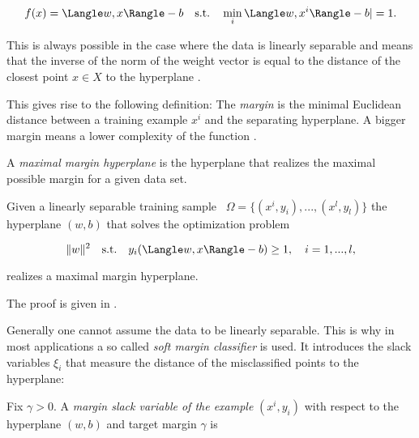 \[ f(x) = \Langle w, x\Rangle - b  \quad \text{s.t.} \quad \min_i \Langle w,x^i\Rangle -b| = 1.\] 

This is always possible in the case where the data is  linearly separable and means that the inverse of the norm of the weight vector is equal to the distance of the closest point \(x \in X \) to  the hyperplane \cite[p. 10]{Kunapuli2008}.



This gives rise to the following definition:
The \emph{margin} is the minimal Euclidean distance between a training example \(x^i\) and the separating hyperplane.
A bigger margin means a lower complexity of the function \cite{Cristianini2000}. 

A \emph{maximal margin hyperplane} is the hyperplane that realizes the maximal possible margin for a given data set.

\begin{proposition}
Given a linearly separable training sample \ \(\Omega = \{(x^i,y_i),...,(x^l,y_l)\}\) the hyperplane \((w,b)\) that solves the optimization problem

\[\|w\|^2 \quad \text{s.t.} \quad y_i(\Langle w,x\Rangle-b)\geq 1, \quad i = 1,...,l, \]

realizes a maximal margin hyperplane.
\end{proposition}

The proof is given in \cite[chapter 6.1]{Cristianini2000}. 

Generally one cannot assume the data to be linearly separable. This is why in most applications a so called \emph{soft margin classifier} is used. It introduces the slack variables \(\xi_i\) that measure the distance of the misclassified points to the hyperplane:


Fix \(\gamma > 0\). A \emph{margin slack variable of the example} \((x^i,y_i)\) with respect to the hyperplane \((w,b)\) and target margin \(\gamma\) is 

